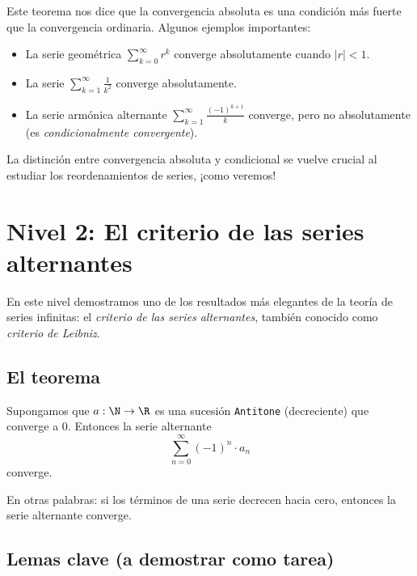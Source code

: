Este teorema nos dice que la convergencia absoluta es una condición más fuerte que la convergencia ordinaria. Algunos ejemplos importantes:
\begin{itemize}
  \item La serie geométrica $\sum_{k=0}^{\infty} r^k$ converge absolutamente cuando $|r| < 1$.
  \item La serie $\sum_{k=1}^{\infty} \frac{1}{k^2}$ converge absolutamente.
  \item La serie armónica alternante $\sum_{k=1}^{\infty} \frac{(-1)^{k+1}}{k}$ converge, pero no absolutamente (es \emph{condicionalmente convergente}).
\end{itemize}
La distinción entre convergencia absoluta y condicional se vuelve crucial al estudiar los reordenamientos de series, ¡como veremos!

\section{Nivel 2: El criterio de las series alternantes}

En este nivel demostramos uno de los resultados más elegantes de la teoría de series infinitas: el \emph{criterio de las series alternantes}, también conocido como \emph{criterio de Leibniz}.

\subsection{El teorema}

\begin{teorema}[AlternatingSeriesTest]
Supongamos que $a : \N \to \R$ es una sucesión \texttt{Antitone} (decreciente) que converge a $0$. Entonces la serie alternante
\[
  \sum_{n=0}^{\infty} (-1)^n \cdot a_n
\]
converge.
\end{teorema}

En otras palabras: si los términos de una serie decrecen hacia cero, entonces la serie alternante converge.

\subsection{Lemas clave (a demostrar como tarea)}

